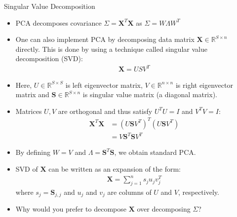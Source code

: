 \documentclass[9pt]{beamer}
\begin{document}
\begin{frame}{Singular Value Decomposition}

\begin{itemize}
\setlength{\itemsep}{3pt}
\item PCA decomposes covariance $\Sigma=\mathbf{X}^T\mathbf{X}$ as $\Sigma=W\Lambda W^T$

\item One can also implement PCA by decomposing data matrix $\mathbf{X}\in\mathbb{R}^{S\times n}$ directly. This is done by using a technique called singular value decomposition (SVD):
\begin{align*}
\mathbf{X}=USV^T
\end{align*}
\item Here, $U\in \mathbb{R}^{S\times S}$ is left eigenvector matrix, $V\in \mathbb{R}^{n\times n}$ is right eigenvector matrix and $\mathbf{S}\in \mathbb{R}^{S\times n}$ is singular value matrix (a diagonal matrix). 
\item Matrices $U,V$ are orthogonal and thus satisfy $U^TU=I$ and $V^TV=I$:
\begin{align*}
\mathbf{X}^T\mathbf{X}&=(U\mathbf{S}V^T)^T(U\mathbf{S}V^T)\\
&=V\mathbf{S}^T\mathbf{S}V^T
\end{align*}
\item By defining $W=V$ and $\Lambda=\mathbf{S}^T\mathbf{S}$, we obtain standard PCA. 
\item SVD of $\mathbf{X}$ can be written as an expansion of the form:
\begin{align*}
\mathbf{X}=\sum_{j=1}^ns_ju_jv_j^T
\end{align*}
where $s_j=\mathbf{S}_{j,j}$ and $u_j$ and $v_j$ are columns of $U$ and $V$, respectively. 
\item Why would you prefer to decompose $\mathbf{X}$ over decomposing $\Sigma$?
 
\end{itemize}


\end{frame}
\end{document}
